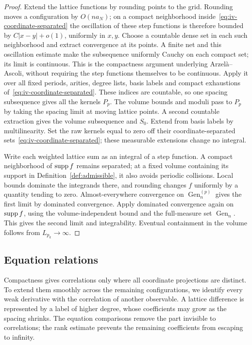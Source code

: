 \begin{proof}
Extend the lattice functions by rounding points to the grid.
Rounding moves a configuration by $O(na_N)$; on a compact neighborhood inside~\eqref{eq:iv-coordinate-separated} the oscillation of these step functions is therefore bounded by $C|x-y|+o(1)$, uniformly in $x,y$.
Choose a countable dense set in each such neighborhood and extract convergence at its points.
A finite net and this oscillation estimate make the subsequence uniformly Cauchy on each compact set; its limit is continuous.
This is the compactness argument underlying Arzelà--Ascoli, without requiring the step functions themselves to be continuous.
Apply it over all fixed periods, arities, degree lists, basis labels and compact exhaustions of~\eqref{eq:iv-coordinate-separated}.
These indices are countable, so one spacing subsequence gives all the kernels $P_p$.
The volume bounds and moduli pass to $P_p$ by taking the spacing limit at moving lattice points.
A second countable extraction gives the volume subsequence and $S_0$.
Extend from basis labels by multilinearity.
Set the raw kernels equal to zero off their coordinate-separated sets~\eqref{eq:iv-coordinate-separated}; these measurable extensions change no integral.

Write each weighted lattice sum as an integral of a step function.
A compact neighborhood of $\operatorname{supp} f$ remains separated; at a fixed volume containing its support in Definition~\ref{def:admissible}, it also avoids periodic collisions.
Local bounds dominate the integrands there, and rounding changes $f$ uniformly by a quantity tending to zero.
Almost-everywhere convergence on $\operatorname{Gen}^{(p)}_n$ gives the first limit by dominated convergence.
Apply dominated convergence again on $\operatorname{supp} f$, using the volume-independent bound and the full-measure set $\operatorname{Gen}_n$.
This gives the second limit and integrability.
Eventual containment in the volume follows from $L_{p_k}\to\infty$.
\end{proof}

\subsection{Equation relations}\label{subsec:iv-equations}

Compactness gives correlations only where all coordinate projections are distinct.
To extend them smoothly across the remaining configurations, we identify every weak derivative with the correlation of another observable.
A lattice difference is represented by a label of higher degree, whose coefficients may grow as the spacing shrinks.
The equation comparisons remove the part invisible to correlations; the rank estimate prevents the remaining coefficients from escaping to infinity.

